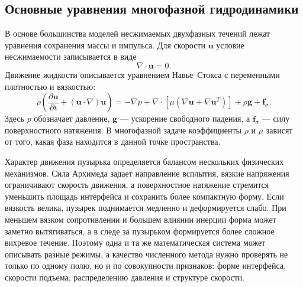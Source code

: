 \documentclass[12pt,a4paper]{article}
\begin{document}
\subsection{Основные уравнения многофазной гидродинамики}

В основе большинства моделей несжимаемых двухфазных течений лежат уравнения
сохранения массы и импульса. Для скорости \(\mathbf{u}\) условие
несжимаемости записывается в виде
\begin{equation}
    \nabla\cdot\mathbf{u}=0.
    \label{eq:review_incompressibility}
\end{equation}
Движение жидкости описывается уравнением Навье--Стокса с переменными
плотностью и вязкостью:
\begin{equation}
    \rho
    \left(
        \frac{\partial\mathbf{u}}{\partial t}
        +(\mathbf{u}\cdot\nabla)\mathbf{u}
    \right)
    =
    -\nabla p
    +\nabla\cdot
    \left[
        \mu
        \left(\nabla\mathbf{u}+\nabla\mathbf{u}^{T}\right)
    \right]
    +\rho\mathbf{g}
    +\mathbf{f}_{\sigma}.
    \label{eq:review_momentum}
\end{equation}
Здесь \(p\) обозначает давление, \(\mathbf{g}\) --- ускорение свободного
падения, а \(\mathbf{f}_{\sigma}\) --- силу поверхностного натяжения. В
многофазной задаче коэффициенты \(\rho\) и \(\mu\) зависят от того, какая фаза
находится в данной точке пространства.

Характер движения пузырька определяется балансом нескольких физических
механизмов. Сила Архимеда задает направление всплытия, вязкие напряжения
ограничивают скорость движения, а поверхностное натяжение стремится уменьшить
площадь интерфейса и сохранить более компактную форму. Если вязкость велика,
пузырек поднимается медленно и деформируется слабо. При меньшем вязком
сопротивлении и большем влиянии инерции форма может заметно вытягиваться, а в
следе за пузырьком формируется более сложное вихревое течение. Поэтому одна и
та же математическая система может описывать разные режимы, а качество
численного метода нужно проверять не только по одному полю, но и по
совокупности признаков: форме интерфейса, скорости подъема, распределению
давления и структуре скорости.
\end{document}
